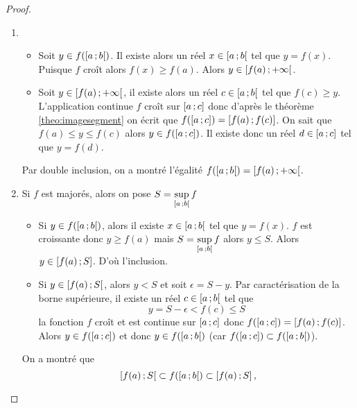 \begin{proof}
  \begin{enumerate}
  \item
    \begin{itemize}
    \item Soit \(y \in f(\left[ a \, ;  b \right[)\). Il existe alors un réel \(x \in \left[ a \, ;  b \right[\) tel que \(y=f(x)\). Puisque \(f\) croît alors \(f(x) \geqslant f(a)\). Alors \(y \in \left[ f(a) \, ;  +\infty \right[\).
    \item Soit \(y \in \left[ f(a) \, ;  +\infty \right[\), il existe alors un réel \(c \in \left[ a \, ;  b \right[\) tel que \(f(c) \geqslant y\). L'application continue \(f\) croît sur \(\left[ a \, ;  c \right]\) donc d'après le théorème~
\ref{theo:imagesegment} on écrit que \(f(\left[ a \, ;  c \right])=\left[ f(a) \, ;  f(c) \right]\). On sait que \(f(a) \le y \leqslant f(c)\) alors \(y \in f(\left[ a \, ;  c \right])\). Il existe donc un réel \(d \in \left[ a \, ;  c \right]\) tel que \(y=f(d)\).
    \end{itemize}
    Par double inclusion, on a montré l'égalité \(f(\left[ a \, ;  b \right[)=\left[ f(a) \, ;  +\infty \right[\).
  \item Si \(f\) est majorés, alors on pose \(S=\sup\limits_{\left[ a \, ;  b \right[}f\)
    \begin{itemize}
    \item Si \(y \in f(\left[ a \, ;  b \right[)\), alors il existe \(x \in \left[ a \, ;  b \right[\) tel que \(y=f(x)\). \(f\) est croissante donc \(y \geqslant f(a)\) mais \(S=\sup\limits_{\left[ a \, ;  b \right[}f\) alors \(y \leqslant S\). Alors \(y \in \left[ f(a) \, ;  S \right]\). D'où l'inclusion.
    \item Si \(y \in \left[ f(a) \, ;  S \right[\), alors \(y < S\) et soit \(\epsilon=S-y\). Par caractérisation de la borne supérieure, il existe un réel \(c \in \left[ a \, ;  b \right[\) tel que
      \begin{equation}
        y=S-\epsilon < f(c) \leqslant S
      \end{equation}
      la fonction \(f\) croît et est continue sur \(\left[ a \, ;  c \right]\) donc \(f(\left[ a \, ;  c \right])=\left[ f(a) \, ;  f(c) \right]\). Alors \(y \in f(\left[ a \, ;  c \right])\) et donc \(y \in f(\left[ a \, ;  b \right[)\) (car \(f(\left[ a \, ;  c \right]) \subset f(\left[ a \, ;  b \right[)\)).
    \end{itemize}
    On a montré que
    \begin{equation}
      \left[ f(a) \, ;  S \right[ \subset f(\left[ a \, ;  b \right[) \subset \left[ f(a) \, ;  S \right],
    \end{equation}

\end{enumerate}
\end{proof}
